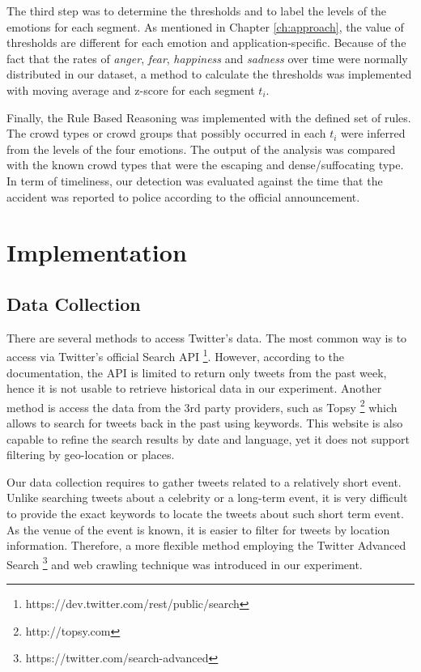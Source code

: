 The third step was to determine the thresholds and to label the levels of the emotions for each segment. As mentioned in Chapter \ref{ch:approach}, the value of thresholds are different for each emotion and application-specific. Because of the fact that the rates of \textit{anger}, \textit{fear}, \textit{happiness} and \textit{sadness} over time were normally distributed in our dataset, a method to calculate the thresholds was implemented with moving average and z-score for each segment \(t_i\). 

Finally, the Rule Based Reasoning was implemented with the defined set of rules. The crowd types or crowd groups that possibly occurred in each \(t_i\) were inferred from the levels of the four emotions. The output of the analysis was compared with the known crowd types that were the escaping and dense/suffocating type. In term of timeliness, our detection was evaluated against the time that the accident was reported to police according to the official announcement.

\section{Implementation}

\subsection{Data Collection}
There are several methods to access Twitter's data. The most common way is to access via Twitter's official Search API \footnote{https://dev.twitter.com/rest/public/search}. However, according to the documentation, the API is limited to return only tweets from the past week, hence it is not usable to retrieve historical data in our experiment. Another method is access the data from the 3rd party providers, such as Topsy \footnote{http://topsy.com} which allows to search for tweets back in the past using keywords. This website is also capable to refine the search results by date and language, yet it does not support filtering by geo-location or places. 

Our data collection requires to gather tweets related to a relatively short event. Unlike searching tweets about a celebrity or a long-term event, it is very difficult to provide the exact keywords to locate the tweets about such short term event. As the venue of the event is known, it is easier to filter for tweets by location information. Therefore, a more flexible method employing the Twitter Advanced Search \footnote{https://twitter.com/search-advanced} and web crawling technique was introduced in our experiment.

